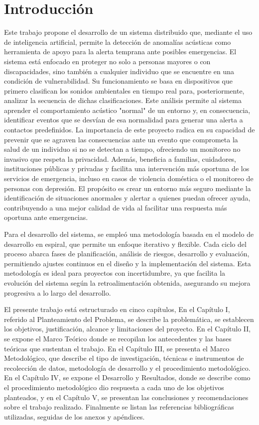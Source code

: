 \chapter*{Introducción}

Este trabajo propone el desarrollo de un sistema distribuido que, mediante el uso de inteligencia artificial, permite la detección de anomalías acústicas como herramienta de apoyo para la alerta temprana ante posibles emergencias. El sistema está enfocado en proteger no solo a personas mayores o con discapacidades, sino también a cualquier individuo que se encuentre en una condición de vulnerabilidad. Su funcionamiento se basa en dispositivos que primero clasifican los sonidos ambientales en tiempo real para, posteriormente, analizar la secuencia de dichas clasificaciones. Este análisis permite al sistema aprender el comportamiento acústico "normal" de un entorno y, en consecuencia, identificar eventos que se desvían de esa normalidad para generar una alerta a contactos predefinidos. La importancia de este proyecto radica en su capacidad de prevenir que se agraven las consecuencias ante un evento que comprometa la salud de un individuo si no se detectan a tiempo, ofreciendo un monitoreo no invasivo que respeta la privacidad. Además, beneficia a familias, cuidadores, instituciones públicas y privadas y facilita una intervención más oportuna de los servicios de emergencia, incluso en casos de violencia doméstica o el monitoreo de personas con depresión. El propósito es crear un entorno más seguro mediante la identificación de situaciones anormales y alertar a quienes puedan ofrecer ayuda, contribuyendo a una mejor calidad de vida al facilitar una respuesta más oportuna ante emergencias.

Para el desarrollo del sistema, se empleó una metodología basada en el modelo de desarrollo en espiral, que permite un enfoque iterativo y flexible. Cada ciclo del proceso abarca fases de planificación, análisis de riesgos, desarrollo y evaluación, permitiendo ajustes continuos en el diseño y la implementación del sistema. Esta metodología es ideal para proyectos con incertidumbre, ya que facilita la evolución del sistema según la retroalimentación obtenida, asegurando su mejora progresiva a lo largo del desarrollo.

El presente trabajo está estructurado en cinco capítulos, En el Capítulo I, referido al Planteamiento del Problema, se describe la problemática, se establecen los objetivos, justificación, alcance y limitaciones del proyecto. En el Capítulo II, se expone el Marco Teórico donde se recopilan los antecedentes y las bases teóricas que sustentan el trabajo. En el Capítulo III, se presenta el Marco Metodológico, que describe el tipo de investigación, técnicas e instrumentos de recolección de datos, metodología de desarrollo y el procedimiento metodológico. En el Capítulo IV, se expone el Desarrollo y Resultados, donde se describe como el procedimiento metodológico dio respuesta a cada uno de los objetivos planteados, y en el Capítulo V, se presentan las conclusiones y recomendaciones sobre el trabajo realizado. Finalmente se listan las referencias bibliográficas utilizadas, seguidas de los anexos y apéndices.

\clearpage
